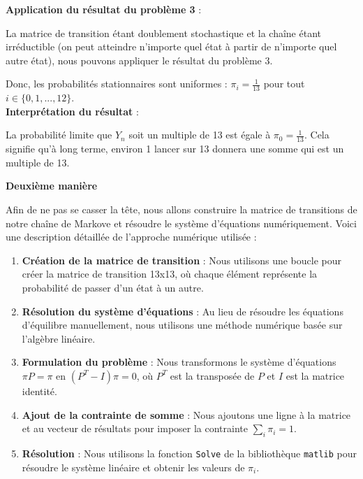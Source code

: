 \documentclass{article}
\begin{document}
        \vspace{.3cm}
        \textbf{Application du résultat du problème 3} :

            \vspace{.2cm}
            La matrice de transition étant doublement stochastique et la chaîne étant irréductible (on peut atteindre n'importe quel état à partir de n'importe quel autre état), nous pouvons appliquer le résultat du problème 3.

            \vspace{.2cm}
            Donc, les probabilités stationnaires sont uniformes : $\pi_i = \frac{1}{13}$ pour tout $i \in \{0, 1, ..., 12\}$. \\

        \textbf{Interprétation du résultat} :
            
            \vspace{.2cm}
            La probabilité limite que $Y_n$ soit un multiple de 13 est égale à $\pi_0 = \frac{1}{13}$. Cela signifie qu'à long terme, environ 1 lancer sur 13 donnera une somme qui est un multiple de 13. 

    \vspace{.5cm}
    {\large \textbf{Deuxième manière}}

    \vspace{.3cm}
    Afin de ne pas se casser la tête, nous allons construire la matrice de transitions de notre chaîne de Markove et résoudre le système d'équations numériquement. Voici une description détaillée de l'approche numérique utilisée :

    \begin{enumerate}
        \item \textbf{Création de la matrice de transition} :
        Nous utilisons une boucle pour créer la matrice de transition 13x13, où chaque élément représente la probabilité de passer d'un état à un autre.

        \item \textbf{Résolution du système d'équations} :
        Au lieu de résoudre les équations d'équilibre manuellement, nous utilisons une méthode numérique basée sur l'algèbre linéaire.

        \item \textbf{Formulation du problème} :
        Nous transformons le système d'équations $\pi P = \pi$ en $(P^T - I)\pi = 0$, où $P^T$ est la transposée de $P$ et $I$ est la matrice identité.

        \item \textbf{Ajout de la contrainte de somme} :
        Nous ajoutons une ligne à la matrice et au vecteur de résultats pour imposer la contrainte $\sum_i \pi_i = 1$.

        \item \textbf{Résolution} :
        Nous utilisons la fonction \texttt{Solve} de la bibliothèque \texttt{matlib} pour résoudre le système linéaire et obtenir les valeurs de $\pi_i$.
    \end{enumerate}
\end{document}
